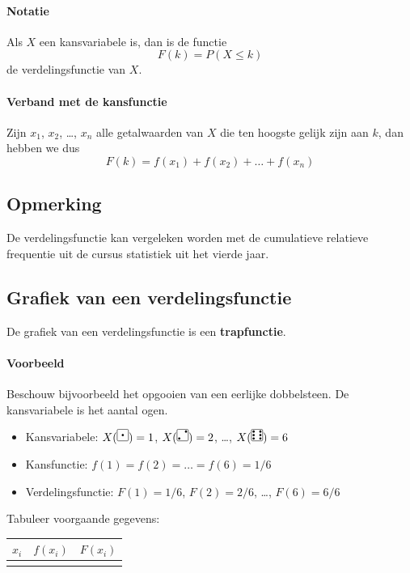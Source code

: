 \documentclass[a4paper,12pt, twoside]{article}
\newcommand{\dice}[1]{
\begin{tikzpicture}[x=1em,y=1em,radius=0.1]
  \draw[rounded corners=1] (0,0) rectangle (1,1);
  \ifodd#1
    \fill (0.5,0.5) circle;
  \fi
  \ifnum#1>1
    \fill (0.2,0.2) circle;
    \fill (0.8,0.8) circle;
   \ifnum#1>3
     \fill (0.2,0.8) circle;
     \fill (0.8,0.2) circle;
    \ifnum#1>5
      \fill (0.8,0.5) circle;
      \fill (0.2,0.5) circle;
    \fi
  \fi
\fi
\end{tikzpicture}
}
\begin{document}
\paragraph*{Notatie}
Als $X$ een kansvariabele is, dan is de functie
$$F(k)=P(X\leq k)$$
de verdelingsfunctie van $X$.

\paragraph*{Verband met de kansfunctie}
Zijn $x_1$, $x_2$, \ldots, $x_n$ alle getalwaarden van $X$ die ten hoogste gelijk zijn aan $k$, dan hebben we dus
$$F(k) = f(x_1) + f(x_2) + \ldots + f(x_n)$$

\subsection{Opmerking}

De verdelingsfunctie kan vergeleken worden met de cumulatieve relatieve frequentie uit de cursus statistiek uit het vierde jaar.

\subsection{Grafiek van een verdelingsfunctie}

De grafiek van een verdelingsfunctie is een {\bf trapfunctie}.

\paragraph*{Voorbeeld} Beschouw bijvoorbeeld het opgooien van een eerlijke dobbelsteen. De kansvariabele is het aantal ogen.
\begin{itemize}
  \item Kansvariabele: $X(\dice{1})=1$, $X(\dice{2})=2$, \ldots, $X(\dice{6})=6$
  \item Kansfunctie: $f(1)=f(2)=\ldots=f(6)=1/6$
  \item Verdelingsfunctie: $F(1)=1/6$, $F(2)=2/6$, \ldots, $F(6)=6/6$
\end{itemize}

\begin{oefening}
Tabuleer voorgaande gegevens:
\begin{center}
  \begin{tabular}{c|c|c}
    $x_i$ & $f(x_i)$ & $F(x_i)$\\
    \hline
    & &\\[3.5cm]
  \end{tabular}
\end{center}
\end{oefening}
\end{document}
